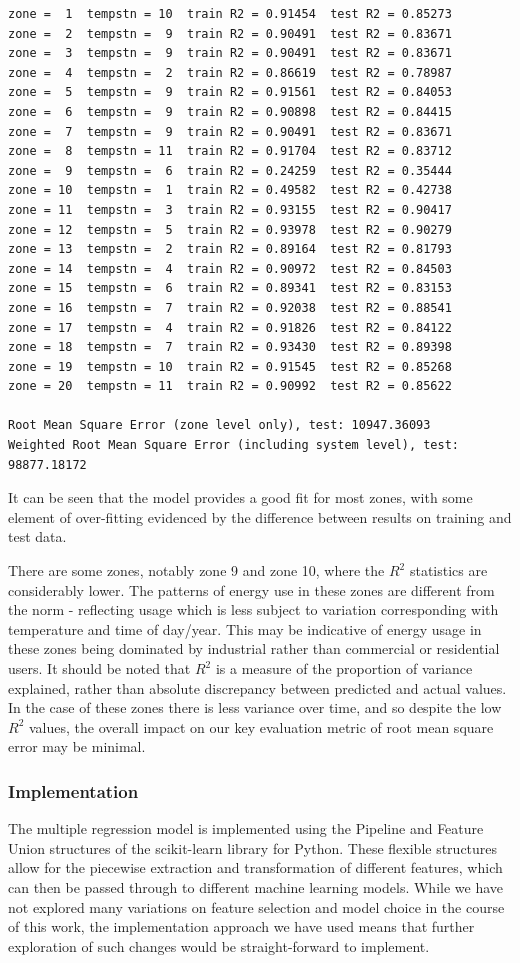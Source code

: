 \documentclass{article} %
\begin{document}
\begin{verbatim}
zone =  1  tempstn = 10  train R2 = 0.91454  test R2 = 0.85273
zone =  2  tempstn =  9  train R2 = 0.90491  test R2 = 0.83671
zone =  3  tempstn =  9  train R2 = 0.90491  test R2 = 0.83671
zone =  4  tempstn =  2  train R2 = 0.86619  test R2 = 0.78987
zone =  5  tempstn =  9  train R2 = 0.91561  test R2 = 0.84053
zone =  6  tempstn =  9  train R2 = 0.90898  test R2 = 0.84415
zone =  7  tempstn =  9  train R2 = 0.90491  test R2 = 0.83671
zone =  8  tempstn = 11  train R2 = 0.91704  test R2 = 0.83712
zone =  9  tempstn =  6  train R2 = 0.24259  test R2 = 0.35444
zone = 10  tempstn =  1  train R2 = 0.49582  test R2 = 0.42738
zone = 11  tempstn =  3  train R2 = 0.93155  test R2 = 0.90417
zone = 12  tempstn =  5  train R2 = 0.93978  test R2 = 0.90279
zone = 13  tempstn =  2  train R2 = 0.89164  test R2 = 0.81793
zone = 14  tempstn =  4  train R2 = 0.90972  test R2 = 0.84503
zone = 15  tempstn =  6  train R2 = 0.89341  test R2 = 0.83153
zone = 16  tempstn =  7  train R2 = 0.92038  test R2 = 0.88541
zone = 17  tempstn =  4  train R2 = 0.91826  test R2 = 0.84122
zone = 18  tempstn =  7  train R2 = 0.93430  test R2 = 0.89398
zone = 19  tempstn = 10  train R2 = 0.91545  test R2 = 0.85268
zone = 20  tempstn = 11  train R2 = 0.90992  test R2 = 0.85622

Root Mean Square Error (zone level only), test: 10947.36093
Weighted Root Mean Square Error (including system level), test: 98877.18172
\end{verbatim}

It can be seen that the model provides a good fit for most zones, with some element of over-fitting evidenced by the difference between results on training and test data.

There are some zones, notably zone 9 and zone 10, where the $R^2$ statistics are considerably lower.  The patterns of energy use in these zones are different from the norm - reflecting usage which is less subject to variation corresponding with temperature and time of day/year.  This may be indicative of energy usage in these zones being dominated by industrial rather than commercial or residential users.  It should be noted that $R^2$ is a measure of the proportion of variance explained, rather than absolute discrepancy between predicted and actual values.  In the case of these zones there is less variance over time, and so despite the low $R^2$ values, the overall impact on our key evaluation metric of root mean square error may be minimal.

\subsubsection*{Implementation}
The multiple regression model is implemented using the Pipeline and Feature Union structures of the scikit-learn library for Python.  These flexible structures allow for the piecewise extraction and transformation of different features, which can then be passed through to different machine learning models.  While we have not explored many variations on feature selection and model choice in the course of this work, the implementation approach we have used means that further exploration of such changes would be straight-forward to implement.
\end{document}
